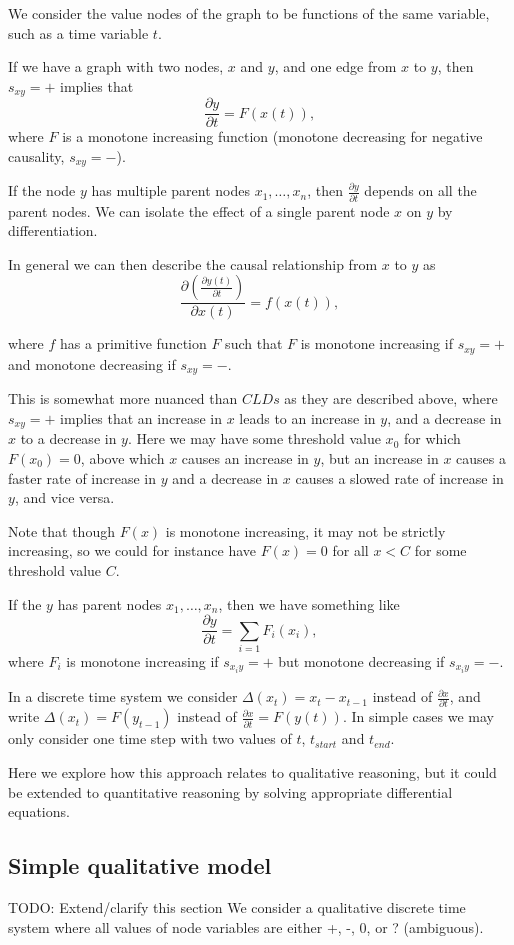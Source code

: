 \documentclass[a4paper,11pt]{article}
\begin{document}
We consider the value nodes of the graph to be functions of the same
variable, such as a time variable $t$.

If we have a graph with two nodes, $x$ and $y$, and one edge from $x$
to $y$, then $s_{xy}=+$ implies that
\[\frac{\partial y}{\partial t} = F(x(t)),\]
where $F$ is a monotone increasing function (monotone decreasing for negative
causality, $s_{xy}=-$).

If the node $y$ has multiple parent nodes $x_1,\ldots,x_n$, then
$\frac{\partial y}{\partial t}$ depends on all the parent nodes. We can
isolate the effect of a single parent node $x$ on $y$ by differentiation.

In general we can then describe the causal relationship from $x$ to
$y$ as
\[\frac{\partial\left( \frac{\partial y(t)}{\partial t} \right)}{\partial x(t)} =
  f(x(t)),\]

where $f$ has a primitive function $F$ such that $F$ is monotone
increasing if $s_{xy}=+$ and monotone decreasing if $s_{xy}= -$.

This is somewhat more nuanced than $CLDs$ as they are described above,
where $s_{xy}=+$ implies that an increase in $x$ leads to an increase
in $y$, and a decrease in $x$ to a decrease in $y$.
%
Here we may have some threshold value $x_0$ for which $F(x_0) = 0$,
above which $x$ causes an increase in $y$, but an increase in $x$
causes a faster rate of increase in $y$ and a decrease in $x$ causes a
slowed rate of increase in $y$, and vice versa.

Note that though $F(x)$ is monotone increasing, it may not be strictly
increasing, so we could for instance have $F(x) = 0$ for all $x < C$
for some threshold value $C$.

If the $y$ has parent nodes $x_1,\ldots,x_n$, then we have something
like
\[\frac{\partial y}{\partial t} = \sum_{i=1}F_i(x_i),\]
where $F_i$ is monotone increasing if $s_{x_iy}=+$ but monotone
decreasing if $s_{x_iy}=-$.

In a discrete time system we consider $\Delta(x_t) = x_t - x_{t-1}$
instead of $\frac{\partial x}{\partial t}$, and write
$\Delta(x_t) = F(y_{t-1})$ instead of
$\frac{\partial x}{\partial t} = F(y(t))$.
%
In simple cases we may only consider one time step with two values of
$t$, $t_{start}$ and $t_{end}$.

Here we explore how this approach relates to qualitative reasoning,
but it could be extended to quantitative reasoning by solving
appropriate differential equations.

\subsection{Simple qualitative model}
TODO: Extend/clarify this section
We consider a qualitative discrete time system where all values of
node variables are either +, -, 0, or ? (ambiguous).
\end{document}
